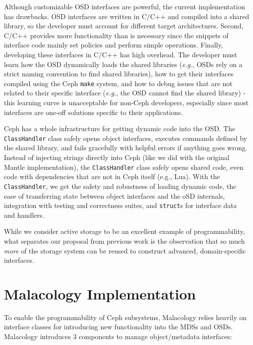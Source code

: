 \documentclass[10pt,twocolumn]{article}
\begin{document}
Although customizable OSD interfaces are powerful, the current
implementation has drawbacks. OSD interfaces are written in C/C++ and
compiled into a shared library, so the developer must account for
different target architectures. Second, C/C++ provides more
functionality than is necessary since the snippets of interface code
mainly set policies and perform simple operations. Finally, developing
these interfaces in C/C++ has high overhead. The developer must learn
how the OSD dynamically loads the shared libraries (\emph{e.g.}, OSDs
rely on a strict naming convention to find shared libraries), how to get
their interfaces compiled using the Ceph \texttt{make} system, and how
to debug issues that are not related to their specific interface
(\emph{e.g.}, the OSD cannot find the shared library) - this learning
curve is unacceptable for non-Ceph developers, especially since most
interfaces are one-off solutions specific to their applications.

Ceph has a whole infrastructure for getting dynamic code into the OSD.
The \texttt{ClassHandler} class safely opens object interfaces, executes
commands defined by the shared library, and fails gracefully with
helpful errors if anything goes wrong. Instead of injecting strings
directly into Ceph (like we did with the original Mantle
implementation), the \texttt{ClassHandler} class safely opens shared
code, even code with dependencies that are not in Ceph itself (e.g.,
Lua). With the \texttt{ClassHandler}, we get the safety and robustness
of loading dynamic code, the ease of transferring state between object
interfaces and the oSD internals, integration with testing and
correctness suites, and \texttt{struct}s for interface data and
handlers.

While we consider active storage to be an excellent example of
programmability, what separates our proposal from previous work is the
observation that so much \emph{more} of the storage system can be reused
to construct advanced, domain-specific interfaces.

\section{Malacology Implementation}\label{malacology-implementation}

\label{implementation}

To enable the programmability of Ceph subsystems, Malacology relies
heavily on interface classes for introducing new functionality into the
MDSs and OSDs. Malacology introduces 3 components to manage
object/metadata interfaces:
\end{document}
